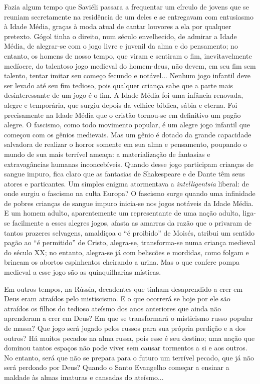 Fazia algum tempo que Saviéli passara a frequentar um círculo de jovens
que se reuniam secretamente na residência de um deles e se entregavam
com entusiasmo à Idade Média, graças à moda atual de cantar louvores a
ela por qualquer pretexto. Gógol tinha o direito, num século
envelhecido, de admirar a Idade Média, de alegrar-se com o jogo livre e
juvenil da alma e do pensamento; no entanto, os homens de nosso tempo,
que viram e sentiram o fim, inevitavelmente medíocre, do talentoso jogo
medieval do homem-deus, não devem, em seu fim sem talento, tentar imitar
seu começo fecundo e notável... Nenhum jogo infantil deve ser levado até
seu fim tedioso, pois qualquer criança sabe que a parte mais
desinteressante de um jogo é o fim. A Idade Média foi uma infância
renovada, alegre e temporária, que surgiu depois da velhice bíblica,
sábia e eterna. Foi precisamente na Idade Média que o cristão tornou-se
em definitivo um pagão alegre. O fascismo, como todo movimento popular,
é um alegre jogo infantil que começou com os gênios medievais. Mas um
gênio é dotado da grande capacidade salvadora de realizar o horror
somente em sua alma e pensamento, poupando o mundo de sua mais terrível
ameaça: a materialização de fantasias e extravagâncias humanas
inconcebíveis. Quando desse jogo participam crianças de sangue impuro,
fica claro que as fantasias de Shakespeare e de Dante têm seus atores e
particantes. Um simples enigma atormentava a \emph{intelligentsia}
liberal: de onde surgiu o fascismo na culta Europa? O fascismo surge
quando uma infinidade de pobres crianças de sangue impuro inicia-se nos
jogos notáveis da Idade Média. E um homem adulto, aparentemente um
representante de uma nação adulta, liga-se facilmente a esses alegres
jogos, afasta as amarras da razão que o privaram de tantos prazeres
selvagens, amaldiçoa o ``é proibido'' de Moisés, atribui um sentido
pagão ao ``é permitido'' de Cristo, alegra-se, transforma-se numa
criança medieval do século XX; no entanto, alegra-se já com beliscões e
mordidas, como folgam e brincam os abortos espinhentos cheirando a
urina. Mas o que confere pompa medieval a esse jogo são as
quinquilharias místicas.

Em outros tempos, na Rússia, decadentes que tinham desaprendido a crer
em Deus eram atraídos pelo mistiscismo. E o que ocorrerá se hoje por ele
são atraídos os filhos do tedioso ateísmo dos anos anteriores que ainda
não aprenderam a crer em Deus? Em que se transformará o misticismo russo
popular de massa? Que jogo será jogado pelos russos para sua própria
perdição e a dos outros? Há muitos pecados na alma russa, pois esse é
seu destino; uma nação que dominou tantos espaços não pode viver sem
causar tormentos a si e aos outros. No entanto, será que não se prepara
para o futuro um terrível pecado, que já não será perdoado por Deus?
Quando o Santo Evangelho começar a ensinar a maldade às almas imaturas e
cansadas do ateísmo...

